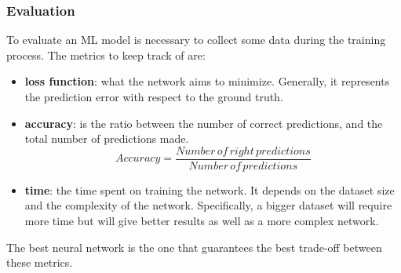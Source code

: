 \documentclass[../thesis.tex]{subfiles}
\begin{document}
\subsubsection{Evaluation}
To evaluate an \acrshort{ML} model is necessary to collect some data during the training process. The metrics to keep track of are:
\begin{itemize}
    \item \textbf{loss function}: what the network aims to minimize. Generally, it represents the prediction error with respect to the ground truth.
    \item \textbf{accuracy}: is the ratio between the number of correct predictions, and the total number of predictions made.
        \begin{equation}
                Accuracy = \frac{Number\, of\, right\, predictions}{Number\, of\, predictions}
        \end{equation}
    \item \textbf{time}: the time spent on training the network. It depends on the dataset size and the complexity of the network. Specifically, a bigger dataset will require more time but will give better results as well as a more complex network.
\end{itemize}
The best neural network is the one that guarantees the best trade-off between these metrics.
\end{document}

